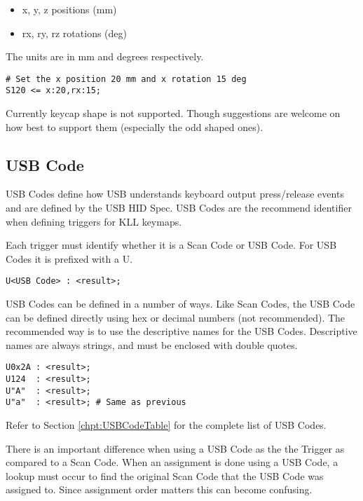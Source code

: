 \documentclass{kiibohd-template}
\begin{document}
\begin{itemize}
\item x, y, z positions (mm)
\item rx, ry, rz rotations (deg)
\end{itemize}

The units are in mm and degrees respectively.

\begin{lstlisting}
# Set the x position 20 mm and x rotation 15 deg
S120 <= x:20,rx:15;
\end{lstlisting}

Currently keycap shape is not supported.
Though suggestions are welcome on how best to support them (especially the odd shaped ones).


\subsection{USB Code}
\label{subsec:USB_Code}

USB Codes define how USB understands keyboard output press/release events and are defined by the USB HID Spec.
USB Codes are the recommend identifier when defining triggers for KLL keymaps.

Each trigger must identify whether it is a Scan Code or USB Code.
For USB Codes it is prefixed with a U.

\begin{lstlisting}
U<USB Code> : <result>;
\end{lstlisting}

USB Codes can be defined in a number of ways.
Like Scan Codes, the USB Code can be defined directly using hex or decimal numbers (not recommended).
The recommended way is to use the descriptive names for the USB Codes.
Descriptive names are always strings, and must be enclosed with double quotes.

\begin{lstlisting}
U0x2A : <result>;
U124  : <result>;
U"A"  : <result>;
U"a"  : <result>; # Same as previous
\end{lstlisting}

Refer to Section \ref{chpt:USBCodeTable} for the complete list of USB Codes.

There is an important difference when using a USB Code as the the Trigger as compared to a Scan Code.
When an assignment is done using a USB Code, a lookup must occur to find the original Scan Code that the USB Code was assigned to.
Since assignment order matters this can become confusing.
\end{document}
